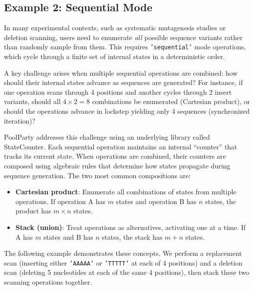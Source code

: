 \documentclass[11pt]{article}
\newcommand{\inpy}[1]{\texttt{#1}}
\begin{document}
\subsection{Example 2: Sequential Mode}
\label{subsec:example-sequential}

In many experimental contexts, such as systematic mutagenesis studies or deletion scanning, users need to enumerate \emph{all} possible sequence variants rather than randomly sample from them. This requires \inpy{'sequential'} mode operations, which cycle through a finite set of internal states in a deterministic order.

A key challenge arises when multiple sequential operations are combined: how should their internal states advance as sequences are generated? For instance, if one operation scans through 4 positions and another cycles through 2 insert variants, should all $4 \times 2 = 8$ combinations be enumerated (Cartesian product), or should the operations advance in lockstep yielding only 4 sequences (synchronized iteration)?

PoolParty addresses this challenge using an underlying library called StateCounter. Each sequential operation maintains an internal ``counter'' that tracks its current state. When operations are combined, their counters are composed using algebraic rules that determine how states propagate during sequence generation. The two most common compositions are:
\begin{itemize}
    \item \textbf{Cartesian product}: Enumerate all combinations of states from multiple operations. If operation A has $m$ states and operation B has $n$ states, the product has $m \times n$ states.
    \item \textbf{Stack (union)}: Treat operations as alternatives, activating one at a time. If A has $m$ states and B has $n$ states, the stack has $m + n$ states.
\end{itemize}

The following example demonstrates these concepts. We perform a replacement scan (inserting either \inpy{'AAAAA'} or \inpy{'TTTTT'} at each of 4 positions) and a deletion scan (deleting 5 nucleotides at each of the same 4 positions), then stack these two scanning operations together.
\end{document}

